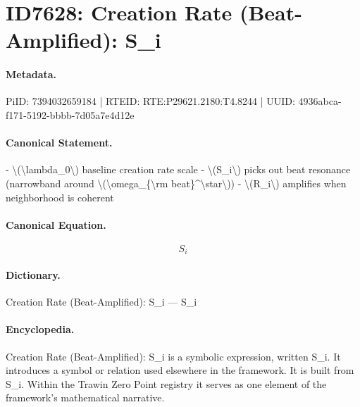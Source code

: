 \section*{ID7628: Creation Rate (Beat-Amplified): S\_i}
\paragraph{Metadata.}
PiID: 7394032659184 | RTEID: RTE:P29621.2180:T4.8244 | UUID: 4936abca-f171-5192-bbbb-7d05a7e4d12e

\paragraph{Canonical Statement.}
- \textbackslash{}(\textbackslash{}lambda\_0\textbackslash{}) baseline creation rate scale - \textbackslash{}(S\_i\textbackslash{}) picks out beat resonance (narrowband around \textbackslash{}(\textbackslash{}omega\_\{\textbackslash{}rm beat\}\textasciicircum{}\textbackslash{}star\textbackslash{})) - \textbackslash{}(R\_i\textbackslash{}) amplifies when neighborhood is coherent

\paragraph{Canonical Equation.}
\[
S_i
\]

\paragraph{Dictionary.}
Creation Rate (Beat-Amplified): S\_i — S\_i

\paragraph{Encyclopedia.}
Creation Rate (Beat-Amplified): S\_i is a symbolic expression, written S\_i. It introduces a symbol or relation used elsewhere in the framework. It is built from S\_i. Within the Trawin Zero Point registry it serves as one element of the framework's mathematical narrative.
